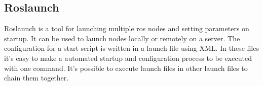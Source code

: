 \subsection{Roslaunch}
Roslaunch is a tool for launching multiple \gls{ros} nodes and setting parameters on startup. It can be used to launch nodes locally or remotely on a server.
The configuration for a start script is written in a launch file using XML. In these files it's easy to make a automated startup and configuration process to be executed with one command. It's possible to execute launch files in other launch files to chain them together.